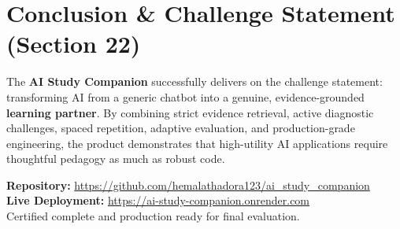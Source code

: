 \documentclass[11pt,a4paper]{article}
\begin{document}
\section{Conclusion \& Challenge Statement (Section 22)}

The \textbf{AI Study Companion} successfully delivers on the challenge statement: transforming AI from a generic chatbot into a genuine, evidence-grounded \textbf{learning partner}. By combining strict evidence retrieval, active diagnostic challenges, spaced repetition, adaptive evaluation, and production-grade engineering, the product demonstrates that high-utility AI applications require thoughtful pedagogy as much as robust code.

\bigskip
\begin{center}
\begin{tcolorbox}[colback=lightbg,colframe=primary,arc=3mm,width=0.9\textwidth,halign=center]
\textbf{Repository:} \url{https://github.com/hemalathadora123/ai_study_companion}\\[0.1cm]
\textbf{Live Deployment:} \url{https://ai-study-companion.onrender.com}\\[0.1cm]
\small Certified complete and production ready for final evaluation.
\end{tcolorbox}
\end{center}
\end{document}

